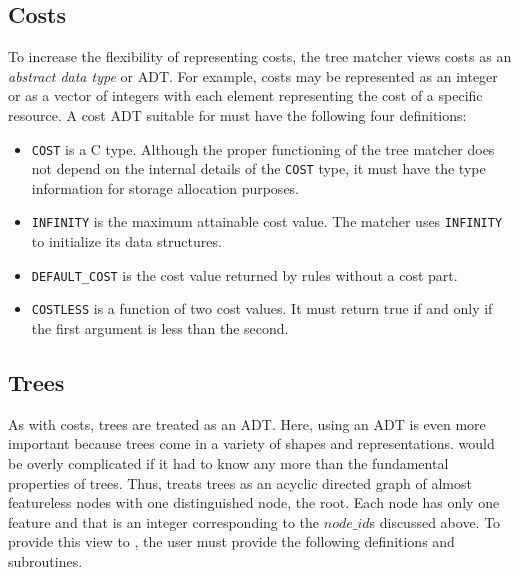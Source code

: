 \subsection{Costs}

To increase the flexibility of representing costs, the tree matcher
views costs as an {\sl abstract data type} or ADT.
For example, costs may be represented as an integer or
as a vector of integers with each element representing the cost of a specific
resource.
A cost ADT suitable for \twiglang{} must have the following four definitions:

\begin{itemize}
\item {\tt COST} is a C type.
Although the proper functioning of the tree matcher
does not depend on the internal details of the {\tt COST} type, it must have
the type information for storage allocation purposes.
\item {\tt INFINITY} is the maximum attainable cost value.
The matcher uses {\tt INFINITY} to initialize its data structures.
\item {\tt DEFAULT\_COST} is the cost
value returned by rules without a cost part.
\item
{\tt COSTLESS} is a function of
two cost values.  It must return true if and only if the first argument is
less than the second.
\end{itemize}

\subsection{Trees}

As with costs, trees are treated as an ADT.  Here, using an ADT is
even more important because trees come in a variety of shapes and
representations.
\Twiglang{} would be overly complicated if it had to
know any more than the fundamental properties of trees.  Thus,
\twiglang{} treats trees as an acyclic directed
graph of almost featureless nodes with one
distinguished node, the root.  Each node has only one feature and that
is an integer corresponding to the $node\_id$\/s discussed above.
To provide this
view to \twiglang{}, the user must provide the following definitions and
subroutines.

